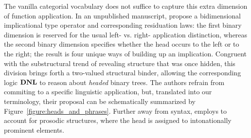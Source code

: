 The vanilla categorial vocabulary does not suffice to capture this extra dimension of function application.
In an unpublished manuscript, \citet{moortgat1991heads} propose a bidimensional implicational type operator and corresponding residuation laws: the first binary dimension is reserved for the usual left- vs. right- application distinction, whereas the second binary dimension specifies whether the head occurs to the left or to the right; the result is four unique ways of building up an implication.
Congruent with the substructural trend of revealing structure that was once hidden, this division brings forth a two-valued structural binder, allowing the corresponding logic $\textbf{DNL}$ to reason about \textit{headed} binary trees.
The authors refrain from commiting to a specific linguistic application, but, translated into our terminology, their proposal can be schematically summarized by Figure~\ref{figure:heads_and_phrases}.
Further away from syntax, \citet{hendriks1997logic} employs  to account for prosodic structures, where the head is assigned to intonationally prominent elements.

